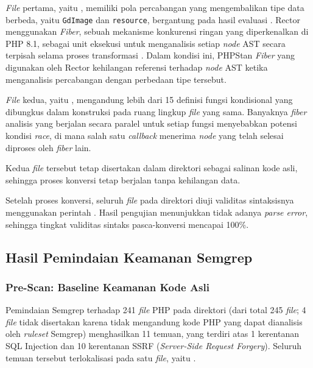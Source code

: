 \textit{File} pertama, yaitu \texttt{}, memiliki pola percabangan yang mengembalikan tipe data berbeda, 
yaitu \texttt{GdImage} dan \texttt{resource}, bergantung pada hasil evaluasi 
\texttt{}. Rector menggunakan \textit{Fiber}, sebuah mekanisme
konkurensi ringan yang diperkenalkan di PHP 8.1,
sebagai unit eksekusi untuk menganalisis setiap 
\textit{node} AST secara terpisah selama proses 
transformasi \cite{phpgroup2022supported}. Dalam kondisi ini, PHPStan \textit{Fiber} yang 
digunakan oleh Rector kehilangan referensi terhadap 
\textit{node} AST ketika menganalisis percabangan 
dengan perbedaan tipe tersebut.

\textit{File} kedua, yaitu \texttt{}, mengandung lebih dari 15 definisi fungsi kondisional yang dibungkus dalam konstruksi \texttt{} pada ruang lingkup \textit{file} yang sama. Banyaknya \textit{fiber} analisis yang berjalan secara paralel untuk setiap fungsi menyebabkan potensi kondisi \textit{race}, di mana salah satu \textit{callback} menerima \textit{node} yang telah selesai diproses oleh \textit{fiber} lain.

Kedua \textit{file} tersebut tetap disertakan dalam direktori \texttt{} sebagai salinan kode asli, sehingga proses konversi tetap berjalan tanpa kehilangan data.

Setelah proses konversi, seluruh \textit{file} pada direktori \texttt{} diuji validitas sintaksisnya menggunakan perintah \texttt{}. Hasil pengujian menunjukkan tidak adanya \textit{parse error}, sehingga tingkat validitas sintaks pasca-konversi mencapai 100\%.
\subsection{Hasil Pemindaian Keamanan Semgrep}

\subsubsection{Pre-Scan: Baseline Keamanan Kode Asli}

Pemindaian Semgrep terhadap 241 \textit{file} PHP pada direktori 
\texttt{} (dari total 245 \textit{file}; 4 
\textit{file} tidak disertakan karena tidak mengandung kode PHP yang 
dapat dianalisis oleh \textit{ruleset} Semgrep) menghasilkan 11 temuan, yang terdiri atas 
1 kerentanan SQL Injection dan 10 kerentanan SSRF (\textit{Server-Side Request Forgery}). 
Seluruh temuan tersebut terlokalisasi pada satu \textit{file}, yaitu 
\texttt{}.


